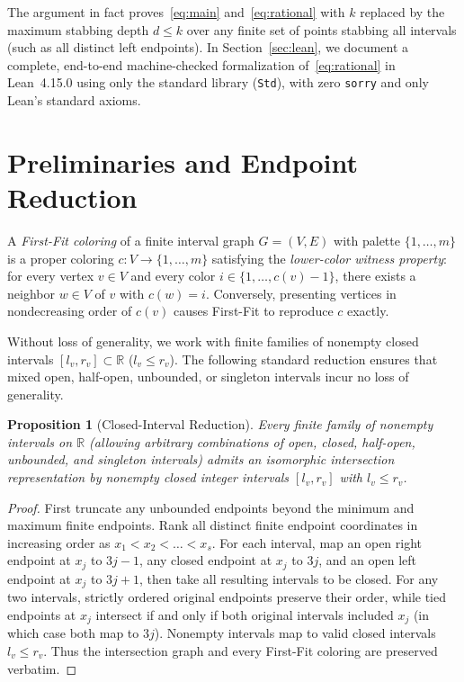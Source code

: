 \documentclass[11pt,a4paper]{article}
\newtheorem{proposition}[theorem]{Proposition}
\theoremstyle{remark}
\begin{document}
The argument in fact proves~\eqref{eq:main} and~\eqref{eq:rational} with $k$ replaced by the maximum stabbing depth $d \le k$ over any finite set of points stabbing all intervals (such as all distinct left endpoints). In Section~\ref{sec:lean}, we document a complete, end-to-end machine-checked formalization of~\eqref{eq:rational} in Lean~4.15.0 using only the standard library (\texttt{Std}), with zero \texttt{sorry} and only Lean's standard axioms.

\section{Preliminaries and Endpoint Reduction}

A \emph{First-Fit coloring} of a finite interval graph $G = (V, E)$ with palette $\{1, \dots, m\}$ is a proper coloring $c : V \to \{1, \dots, m\}$ satisfying the \emph{lower-color witness property}: for every vertex $v \in V$ and every color $i \in \{1, \dots, c(v) - 1\}$, there exists a neighbor $w \in V$ of $v$ with $c(w) = i$. Conversely, presenting vertices in nondecreasing order of $c(v)$ causes First-Fit to reproduce $c$ exactly.

Without loss of generality, we work with finite families of nonempty closed intervals $[l_v, r_v] \subset \mathbb{R}$ ($l_v \le r_v$). The following standard reduction ensures that mixed open, half-open, unbounded, or singleton intervals incur no loss of generality.

\begin{proposition}[Closed-Interval Reduction]\label{prop:endpoints}
Every finite family of nonempty intervals on $\mathbb{R}$ (allowing arbitrary combinations of open, closed, half-open, unbounded, and singleton intervals) admits an isomorphic intersection representation by nonempty closed integer intervals $[l_v, r_v]$ with $l_v \le r_v$.
\end{proposition}

\begin{proof}
First truncate any unbounded endpoints beyond the minimum and maximum finite endpoints. Rank all distinct finite endpoint coordinates in increasing order as $x_1 < x_2 < \dots < x_s$. For each interval, map an open right endpoint at $x_j$ to $3j - 1$, any closed endpoint at $x_j$ to $3j$, and an open left endpoint at $x_j$ to $3j + 1$, then take all resulting intervals to be closed. For any two intervals, strictly ordered original endpoints preserve their order, while tied endpoints at $x_j$ intersect if and only if both original intervals included $x_j$ (in which case both map to $3j$). Nonempty intervals map to valid closed intervals $l_v \le r_v$. Thus the intersection graph and every First-Fit coloring are preserved verbatim.
\end{proof}
\end{document}
